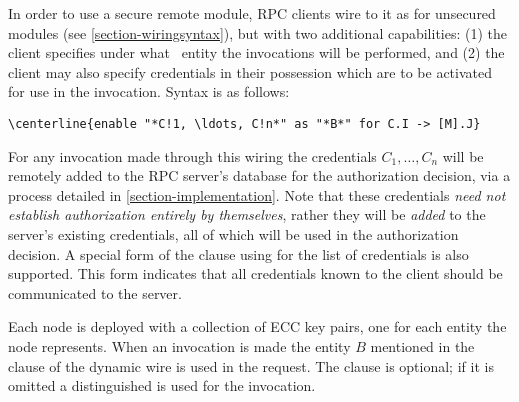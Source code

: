 In order to use a secure remote module, RPC clients wire to it as for
unsecured modules (see \autoref{section-wiringsyntax}), but with two
additional capabilities: (1) the client specifies under what \RT\ entity
the invocations will be performed, and (2) the client may also specify
credentials in their possession which are to be activated for use in the
invocation. Syntax is as follows:

\begin{Verbatim}[fontsize=\small, commandchars=\\\{\}, codes={\catcode`*=3\catcode`!=8}]
\centerline{enable "*C!1, \ldots, C!n*" as "*B*" for C.I -> [M].J}
\end{Verbatim}

For any invocation made through this wiring the credentials $C_1,
\ldots, C_n$ will be remotely added to the RPC server's database for the
authorization decision, via a process detailed in
\autoref{section-implementation}. Note that these credentials \emph{need
  not establish authorization entirely by themselves}, rather they will
be \emph{added} to the server's existing credentials, all of which will
be used in the authorization decision. A special form of the
 clause using  for the list of credentials is
also supported. This form indicates that all credentials known to the
client should be communicated to the server.

Each node is deployed with a collection of ECC key pairs, one for each
entity the node represents. When an invocation is made the entity $B$
mentioned in the  clause of the dynamic wire is used in the
request. The  clause is optional; if it is omitted a
distinguished  is used for the invocation.


